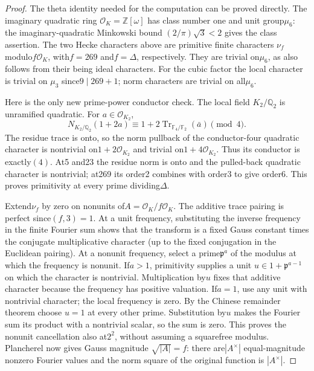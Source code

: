 \begin{proof}
The theta identity needed for the computation can be proved directly.
The imaginary quadratic ring $\mathcal O_K=\mathbb Z[\omega]$ has
class number one and unit group$\mu_6$: the imaginary-quadratic
Minkowski bound $(2/\pi)\sqrt3<2$ gives the class assertion.
The two Hecke characters above are primitive finite characters $\nu_f$
modulo$f\mathcal O_K$, with$f=269$ and$f=\Delta$, respectively.
They are trivial on$\mu_6$, as also follows from their being ideal
characters.  For the cubic factor the local character is trivial on
$\mu_3$ since$9\mid269+1$; norm characters are trivial on all$\mu_6$.

Here is the only new prime-power conductor check.  The local field
$K_2/\mathbb Q_2$ is unramified quadratic.  For $a\in\mathcal O_{K_2}$,
\[
 N_{K_2/\mathbb Q_2}(1+2a)\equiv1+2\operatorname{Tr}_{\mathbb F_4/\mathbb F_2}
                       (\bar a)\pmod4.
\]
The residue trace is onto, so the norm pullback of the conductor-four
quadratic character is nontrivial on$1+2\mathcal O_{K_2}$ and trivial
on$1+4\mathcal O_{K_2}$.  Thus its conductor is exactly$(4)$.
At5 and23 the residue norm is onto and the pulled-back quadratic character
is nontrivial; at269 its order2 combines with order3 to give order6.
This proves primitivity at every prime dividing$\Delta$.

Extend$\nu_f$ by zero on nonunits of$A=\mathcal O_K/f\mathcal O_K$.
The additive trace pairing is perfect since$(f,3)=1$.
At a unit frequency, substituting the inverse frequency in the finite
Fourier sum shows that the transform is a fixed Gauss constant times
the conjugate multiplicative character (up to the fixed conjugation
in the Euclidean pairing).
At a nonunit frequency, select a prime$\mathfrak p^a$ of the modulus
at which the frequency is nonunit.  If$a>1$, primitivity supplies a unit
$u\in1+\mathfrak p^{a-1}$ on which the character is nontrivial.
Multiplication by$u$ fixes that additive character because the frequency
has positive valuation.  If$a=1$, use any unit with nontrivial character;
the local frequency is zero.  By the Chinese remainder theorem choose
$u=1$ at every other prime.  Substitution by$u$ makes the Fourier sum
its product with a nontrivial scalar, so the sum is zero.
This proves the nonunit cancellation also at$2^2$, without assuming
a squarefree modulus.  Plancherel now gives Gauss magnitude
$\sqrt{|A|}=f$: there are$|A^\times|$ equal-magnitude nonzero
Fourier values and the norm square of the original function is
$|A^\times|$.


\end{proof}
